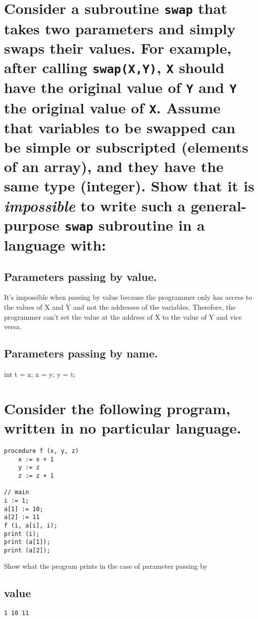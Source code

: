 \documentclass[letterpaper]{article}
\begin{document}
\section{Consider a subroutine \texttt{swap} that takes two parameters and simply swaps their values. For example, after calling \texttt{swap(X,Y)}, \texttt{X} should have the original value of \texttt{Y} and \texttt{Y} the original value of \texttt{X}. Assume that variables to be swapped can be simple or subscripted (elements of an array), and they have the same type (integer). Show that it is \textit{impossible} to write such a general-purpose \texttt{swap} subroutine in a language with:}
\subsection{Parameters passing by value.}
\begin{adjustwidth}{2.35em}{0pt}
It's impossible when passing by value because the programmer only has access to the values of X and Y and not the addresses of the variables. Therefore, the programmer can't set the value at the address of X to the value of Y and vice versa.
\end{adjustwidth}
\subsection{Parameters passing by name.}
\begin{adjustwidth}{2.35em}{0pt}
int t = x;
x = y;
y = t;
\end{adjustwidth}

\section{Consider the following program, written in no particular language.}
\begin{adjustwidth}{2.35em}{0pt}
\begin{Verbatim}
procedure f (x, y, z)
	x := x + 1
	y := z
	z := z + 1

// main
i := 1;
a[1] := 10;
a[2] := 11
f (i, a[i], i);
print (i);
print (a[1]);
print (a[2]);
\end{Verbatim}
Show what the program prints in the case of parameter passing by
\end{adjustwidth}
\subsection{value}
\begin{adjustwidth}{2.35em}{0pt}
\begin{Verbatim}
1 10 11
\end{Verbatim}
\end{adjustwidth}
\end{document}
